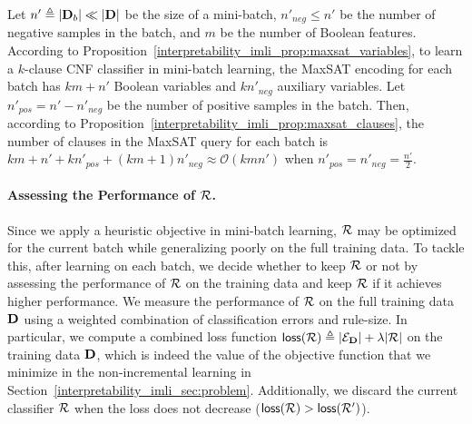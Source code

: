\begin{proposition}
	\label{interpretability_imli_prop:maxsat_complexity_incremental}
	Let $ n' \triangleq |\mathbf{D}_b| \ll |\mathbf{D}| $ be the size of a mini-batch, $ n'_{neg} \le n' $ be the number of negative samples in the batch, and $ m $ be the number of Boolean features. According to Proposition~\ref{interpretability_imli_prop:maxsat_variables}, to learn a $ k $-clause CNF classifier in mini-batch learning, the MaxSAT encoding for each batch has $ km + n' $ Boolean variables and $ kn'_{neg} $ auxiliary variables. Let $ n'_{pos} = n' - n'_{neg} $ be the number of positive samples in the batch. Then, according to Proposition~\ref{interpretability_imli_prop:maxsat_clauses}, the number of clauses in the MaxSAT query for each batch is $ k m+n'+k n'_{pos}+(k m+1)n'_{neg} \approx \mathcal{O}(k m  n' ) $ when $ n'_{pos}= n'_{neg} =\frac{n'}{2} $.
\end{proposition}



%

\paragraph{Assessing  the Performance of $ {\mathcal{R}} $.} Since we apply a heuristic objective in mini-batch learning,  $ {\mathcal{R}} $ may be optimized for the current batch while generalizing poorly on the full training data. To tackle this, after learning on each batch, we decide whether to keep $ {\mathcal{R}} $ or not by assessing the performance of $ {\mathcal{R}} $ on the training data and keep $ {\mathcal{R}} $ if it achieves higher performance. We measure the performance of $ {\mathcal{R}} $ on the full training data $ \mathbf{D} $ using a weighted combination of classification errors and rule-size. In particular, we compute a combined loss function $ \mathsf{loss}({\mathcal{R}}) \triangleq |\mathcal{E}_{\mathbf{D}}| +\lambda |\mathcal{R}| $ on the training data $ \mathbf{D} $, which is indeed the value of the objective function that we minimize in the non-incremental learning in Section~\ref{interpretability_imli_sec:problem}. Additionally, we  discard the current classifier $ {\mathcal{R}} $ when the loss does not decrease ($ \mathsf{loss}({\mathcal{R}}) > \mathsf{loss}({\mathcal{R}}') $). 

